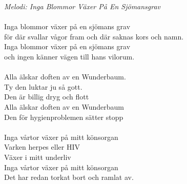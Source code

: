 {\footnotesize\textit{Melodi: Inga Blommor Växer På En Sjömansgrav}}\\
\\
Inga blommor växer på en sjömans grav\\
för där svallar vågor fram och där saknas kors och namn.\\ 
Inga blommor växer på en sjömans grav \\
och ingen känner vägen till hans vilorum.\\
\\
Alla älskar doften av en Wunderbaum.\\
Ty den luktar ju så gott.\\
Den är billig dryg och flott\\
Alla älskar doften av en Wunderbaum\\
Den för hygienproblemen sätter stopp\\
\\
Inga vårtor växer på mitt könsorgan\\
Varken herpes eller HIV\\
Växer i mitt underliv\\
Inga vårtor växer på mitt könsorgan\\
Det har redan torkat bort och ramlat av.
